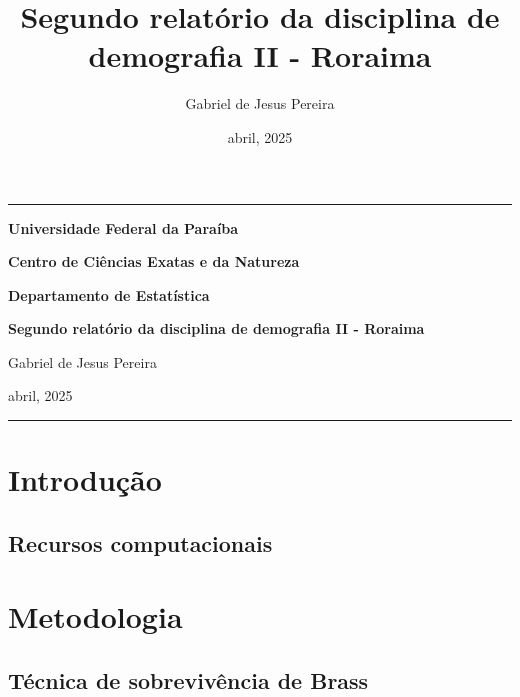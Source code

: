 \documentclass[
  12pt,
  a4paper,
]{scrreprt}
\title{Segundo relatório da disciplina de demografia II - Roraima}
\author{Gabriel de Jesus Pereira}
\date{abril, 2025}
\renewcommand*\contentsname{Índice}
\newcommand\contentsname{Índice}
\begin{document}
\cleardoublepage
\thispagestyle{empty}
{\centering
\noindent\rule{\textwidth}{0.5pt}

\vspace{2ex}

{\Large\bfseries Universidade Federal da Paraíba \par}
\vspace{1ex}
{\Large\bfseries Centro de Ciências Exatas e da Natureza \par}
\vspace{1ex}
{\Large\bfseries Departamento de Estatística \par}

\vfill

{\large\bfseries Segundo relatório da disciplina de demografia II -
Roraima \par}

\vfill

{\large Gabriel de Jesus Pereira \par}
\vfill
{\normalsize abril, 2025 \par}


\noindent\rule{\textwidth}{0.5pt}

}
\renewcommand*\contentsname{\centering Sumário \thispagestyle{empty}}
{
\hypersetup{linkcolor=}
\setcounter{tocdepth}{2}
\tableofcontents
}

\pagestyle{fancy}

\fancyhf{}
\fancyhead[RO, LE]{\thepage}
\fancyhead[LO]{\leftmark}
\fancyhead[RE]{\thepage}


\chapter{Introdução}\label{introduuxe7uxe3o}

\section{Recursos computacionais}\label{recursos-computacionais}

\chapter{Metodologia}\label{metodologia}

\section{Técnica de sobrevivência de
Brass}\label{tuxe9cnica-de-sobrevivuxeancia-de-brass}
\end{document}
